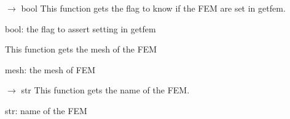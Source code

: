 \documentclass[letterpaper,10pt,english]{sphinxmanual}
\begin{document}
\begin{fulllineitems}
\begin{fulllineitems}
\begin{description}
\end{description}

\end{fulllineitems}


\begin{fulllineitems}
\label{\detokenize{scrimp:scrimp.fem.FEM.get_isSet}}
\pysigstartsignatures
\pysiglinewithargsret
{}
{}
{{ $\rightarrow$ bool}}
\pysigstopsignatures
\sphinxAtStartPar
This function gets the flag to know if the FEM are set in getfem.
\begin{description}
\sphinxAtStartPar
bool: the flag to assert setting in getfem

\end{description}

\end{fulllineitems}


\begin{fulllineitems}
\label{\detokenize{scrimp:scrimp.fem.FEM.get_mesh}}
\pysigstartsignatures
\pysiglinewithargsret
{}
{}
{}
\pysigstopsignatures
\sphinxAtStartPar
This function gets the mesh of the FEM
\begin{description}
\sphinxAtStartPar
mesh: the mesh of FEM

\end{description}

\end{fulllineitems}


\begin{fulllineitems}
\label{\detokenize{scrimp:scrimp.fem.FEM.get_name}}
\pysigstartsignatures
\pysiglinewithargsret
{}
{}
{{ $\rightarrow$ str}}
\pysigstopsignatures
\sphinxAtStartPar
This function gets the name of the FEM.
\begin{description}
\sphinxAtStartPar
str: name of the FEM

\end{description}


\end{fulllineitems}
\end{fulllineitems}
\end{document}
